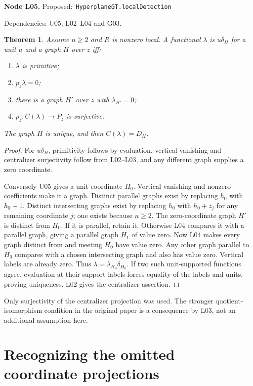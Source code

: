 \documentclass[11pt]{article}
\newtheorem{theorem}{Theorem}[section]
\theoremstyle{remark}\newtheorem{remark}[theorem]{Remark}
\newcommand{\code}[1]{\nolinkurl{#1}}
\newcommand{\node}[3]{\par\Needspace{8\baselineskip}\smallskip\noindent\textbf{Node #1.}\quad
 \textsf{Proposed:}\ \code{#2}\par\noindent
 \textsf{Dependencies:} #3.\par\smallskip}
\begin{document}
\node{L05}{HyperplaneGT.localDetection}{U05, L02--L04 and G03}
\begin{theorem}\label{thm:l05}
Assume $n\geq2$ and $R$ is nonzero local. A functional $\lambda$
is $u\delta_H$ for a unit $u$ and a graph $H$ over $z$ iff:
\begin{enumerate}
\item $\lambda$ is primitive;
\item $p_z\lambda=0$;
\item there is a graph $H'$ over $z$ with $\lambda_{H'}=0$;
\item $p_z:C(\lambda)\to P_z$ is surjective.
\end{enumerate}
The graph $H$ is unique, and then $C(\lambda)=D_H$.
\end{theorem}
\begin{proof}
For $u\delta_H$, primitivity follows by evaluation, vertical
vanishing and centralizer surjectivity follow from L02--L03,
and any different graph supplies a zero coordinate.

Conversely U05 gives a unit coordinate $H_0$. Vertical vanishing
and nonzero coefficients make it a graph. Distinct parallel graphs
exist by replacing $h_0$ with $h_0+1$. Distinct intersecting graphs
exist by replacing $h_0$ with $h_0+z_j$ for any remaining
coordinate $j$; one exists because $n\geq2$.
The zero-coordinate graph $H'$ is distinct from $H_0$. If it is
parallel, retain it. Otherwise L04 compares it with a parallel
graph, giving a parallel graph $H_1$ of value zero. Now L04 makes
every graph distinct from and meeting $H_0$ have value zero.
Any other graph parallel to $H_0$ compares with a chosen
intersecting graph and also has value zero. Vertical labels are
already zero. Thus $\lambda=\lambda_{H_0}\delta_{H_0}$.
If two such unit-supported functions agree, evaluation at their
support labels forces equality of the labels and units, proving
uniqueness. L02 gives the centralizer assertion.
\end{proof}
Only surjectivity of the centralizer projection was used. The
stronger quotient-isomorphism condition in the original paper is
a consequence by L03, not an additional assumption here.

\section{Recognizing the omitted coordinate projections}
\end{document}
